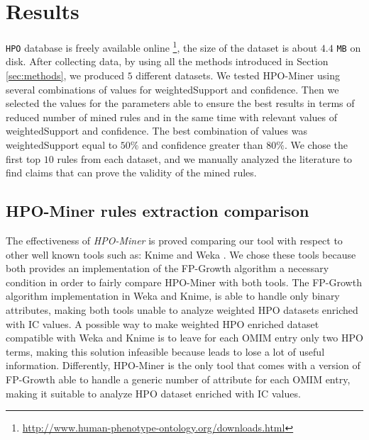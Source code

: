\documentclass{article}
\theoremstyle{definition}
\begin{document}
\section{Results}
\label{sec:results}

\texttt{HPO} database is freely available online \footnote{\url{http://www.human-phenotype-ontology.org/downloads.html}}, the size of the dataset is about $4.4$ \texttt{MB} on disk. After collecting data, by using all the methods introduced in Section \ref{sec:methods}, we produced $5$ different datasets. %
We tested HPO-Miner using several combinations of values for weightedSupport and confidence. Then we selected the values for the parameters able to ensure the best results in terms of reduced number of mined rules and in the same time with relevant values of weightedSupport and confidence. The best combination of values was weightedSupport equal to $50\%$ and confidence greater than $80\%$. We chose the first top $10$ rules from each dataset, and we manually analyzed the literature to find claims that can prove the validity of the mined rules. %

\subsection{HPO-Miner rules extraction comparison}
The effectiveness of \textit{HPO-Miner} is proved comparing our tool with respect to other well known tools such as: Knime \cite{citeulike:5770121} and Weka \cite{weka}. We chose these tools because both provides an implementation of the FP-Growth algorithm a necessary condition in order to fairly compare HPO-Miner with both tools.  The FP-Growth algorithm implementation in Weka and Knime, is able to handle only binary attributes, making both tools unable to analyze weighted HPO datasets enriched with IC values. A possible way to make weighted HPO enriched dataset compatible with Weka and Knime is to leave for each OMIM entry only two HPO terms, making this solution infeasible because leads to lose a lot of useful information. 
Differently, HPO-Miner is the only tool that comes with a version of FP-Growth able to handle a generic number of attribute for each OMIM entry, making it suitable to analyze HPO dataset enriched with IC values.
\end{document}
